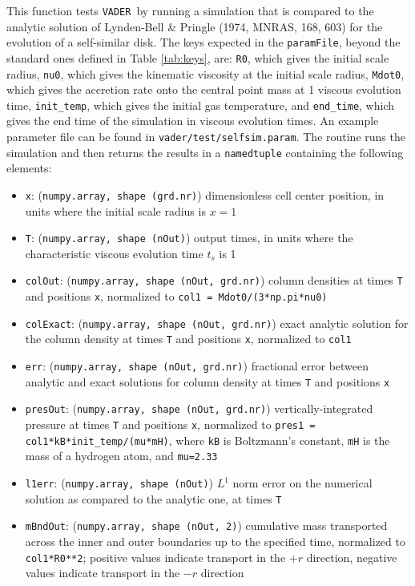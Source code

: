 \documentclass[12pt]{article}
\newcommand{\vader}{\texttt{VADER}}
\begin{document}
This function tests \vader\ by running a simulation that is compared to the analytic solution of Lynden-Bell \& Pringle (1974, MNRAS, 168, 603) for the evolution of a self-similar disk. The keys expected in the \verb=paramFile=, beyond the standard ones defined in Table \ref{tab:keys}, are: \verb=R0=, which gives the initial scale radius, \verb=nu0=, which gives the kinematic viscosity at the initial scale radius, \verb=Mdot0=, which gives the accretion rate onto the central point mass at 1 viscous evolution time, \verb=init_temp=, which gives the initial gas temperature, and \verb=end_time=, which gives the end time of the simulation in viscous evolution times. An example parameter file can be found in \verb=vader/test/selfsim.param=. The routine runs the simulation and then returns the results in a \verb=namedtuple= containing the following elements:
\begin{itemize}
\item \texttt{x}: (\texttt{numpy.array, shape (grd.nr)}) dimensionless cell center position, in units where the initial scale radius is $x=1$
\item \texttt{T}: (\texttt{numpy.array, shape (nOut)}) output times, in units where the characteristic viscous evolution time $t_s$ is 1
\item \texttt{colOut}: (\texttt{numpy.array, shape (nOut, grd.nr)}) column densities at times \verb=T= and positions \verb=x=, normalized to \verb!col1 = Mdot0/(3*np.pi*nu0)!
\item \texttt{colExact}: (\texttt{numpy.array, shape (nOut, grd.nr)}) exact analytic solution for the column density at times \verb=T= and positions \verb=x=, normalized to \verb=col1=
\item \texttt{err}: (\texttt{numpy.array, shape (nOut, grd.nr)}) fractional error between analytic and exact solutions for column density at times \verb=T= and positions \verb=x=
\item \texttt{presOut}: (\texttt{numpy.array, shape (nOut, grd.nr)}) vertically-integrated pressure at times \verb=T= and positions \verb=x=, normalized to \verb!pres1 = col1*kB*init_temp/(mu*mH)!, where \verb=kB= is Boltzmann's constant, \verb=mH= is the mass of a hydrogen atom, and \verb!mu=2.33!
\item \texttt{l1err}: (\texttt{numpy.array, shape (nOut)}) $L^1$ norm error on the numerical solution as compared to the analytic one, at times \verb=T=
\item \texttt{mBndOut}: (\texttt{numpy.array, shape (nOut, 2)}) cumulative mass transported across the inner and outer boundaries up to the specified time, normalized to \verb=col1*R0**2=; positive values indicate transport in the $+r$ direction, negative values indicate transport in the $-r$ direction

\end{itemize}
\end{document}
